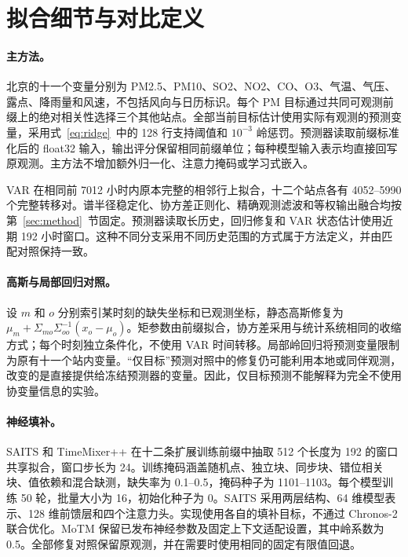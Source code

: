 \section{拟合细节与对比定义}
\label{app:training}

\paragraph{主方法。}
北京的十一个变量分别为 PM2.5、PM10、SO2、NO2、CO、O3、气温、气压、露点、降雨量和风速，不包括风向与日历标识。每个 PM 目标通过共同可观测前缀上的绝对相关性选择三个其他站点。全部当前目标估计使用实际有观测的预测变量，采用式~\eqref{eq:ridge}~中的 128 行支持阈值和 $10^{-3}$ 岭惩罚。预测器读取前缀标准化后的 float32 输入，输出评分保留相同前缀单位；每种模型输入表示均直接回写原观测。主方法不增加额外归一化、注意力掩码或学习式嵌入。

VAR 在相同前 7012 小时内原本完整的相邻行上拟合，十二个站点各有 4052--5990 个完整转移对。谱半径稳定化、协方差正则化、精确观测滤波和等权输出融合均按第~\ref{sec:method}~节固定。预测器读取长历史，回归修复和 VAR 状态估计使用近期 192 小时窗口。这种不同分支采用不同历史范围的方式属于方法定义，并由匹配对照保持一致。

\paragraph{高斯与局部回归对照。}
设 $m$ 和 $o$ 分别索引某时刻的缺失坐标和已观测坐标，静态高斯修复为 $\mu_m+\Sigma_{mo}\Sigma_{oo}^{-1}(x_o-\mu_o)$。矩参数由前缀拟合，协方差采用与统计系统相同的收缩方式；每个时刻独立条件化，不使用 VAR 时间转移。局部岭回归将预测变量限制为原有十一个站内变量。“仅目标”预测对照中的修复仍可能利用本地或同伴观测，改变的是直接提供给冻结预测器的变量。因此，仅目标预测不能解释为完全不使用协变量信息的实验。

\paragraph{神经填补。}
SAITS 和 TimeMixer++ 在十二条扩展训练前缀中抽取 512 个长度为 192 的窗口共享拟合，窗口步长为 24。训练掩码涵盖随机点、独立块、同步块、错位相关块、值依赖和混合缺测，缺失率为 0.1--0.5，掩码种子为 1101--1103。每个模型训练 50 轮，批量大小为 16，初始化种子为 0。SAITS 采用两层结构、64 维模型表示、128 维前馈层和四个注意力头。实现使用各自的填补目标，不通过 Chronos-2 联合优化。MoTM 保留已发布神经参数及固定上下文适配设置，其中岭系数为 0.5。全部修复对照保留原观测，并在需要时使用相同的固定有限值回退。

